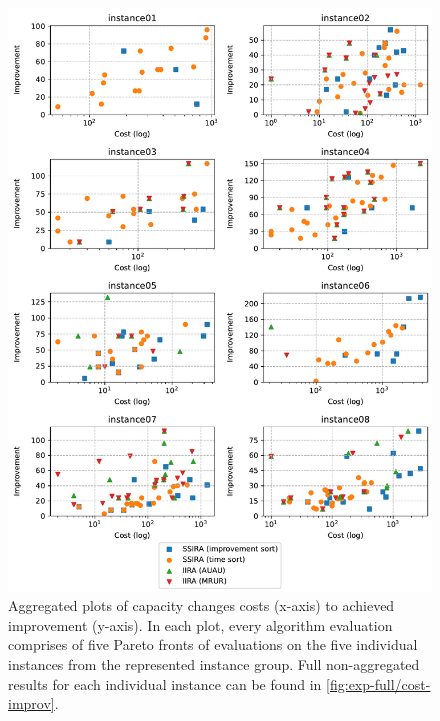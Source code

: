 \begin{figure}[p]
    \centering
    \includegraphics[width=\textwidth]{img/exp_aggregated_cost_improv.pdf}
    \caption{
        Aggregated plots of capacity changes costs (x-axis) to achieved improvement (y-axis).
        In each plot, every algorithm evaluation comprises of five Pareto fronts of evaluations
        on the five individual instances from the represented instance group.
        Full non-aggregated results for each individual instance can be found in \cref{fig:exp-full/cost-improv}.
        }
    \label{fig:exp/cost-improv}
\end{figure}


